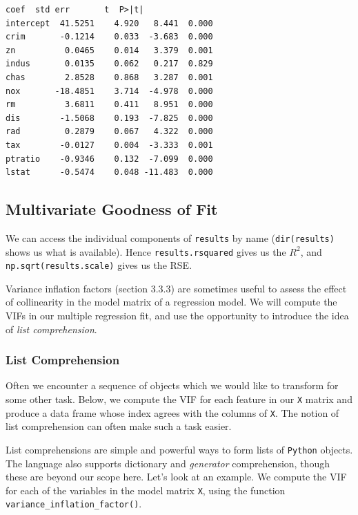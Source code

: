 \documentclass[11pt]{article}
\makeatletter
\newcommand{\boxspacing}{\kern\kvtcb@left@rule\kern\kvtcb@boxsep}
\newcommand{\prompt}[4]{
        {\ttfamily\llap{{\color{#2}[#3]:\hspace{3pt}#4}}\vspace{-\baselineskip}}
    }
\makeatother
\begin{document}
            \begin{tcolorbox}[breakable, size=fbox, boxrule=.5pt, pad at break*=1mm, opacityfill=0]
\prompt{Out}{outcolor}{28}{\boxspacing}
\begin{Verbatim}[commandchars=\\\{\}]
              coef  std err       t  P>|t|
intercept  41.5251    4.920   8.441  0.000
crim       -0.1214    0.033  -3.683  0.000
zn          0.0465    0.014   3.379  0.001
indus       0.0135    0.062   0.217  0.829
chas        2.8528    0.868   3.287  0.001
nox       -18.4851    3.714  -4.978  0.000
rm          3.6811    0.411   8.951  0.000
dis        -1.5068    0.193  -7.825  0.000
rad         0.2879    0.067   4.322  0.000
tax        -0.0127    0.004  -3.333  0.001
ptratio    -0.9346    0.132  -7.099  0.000
lstat      -0.5474    0.048 -11.483  0.000
\end{Verbatim}
\end{tcolorbox}
        
    \hypertarget{multivariate-goodness-of-fit}{%
\subsection{Multivariate Goodness of
Fit}\label{multivariate-goodness-of-fit}}

We can access the individual components of \texttt{results} by name
(\texttt{dir(results)} shows us what is available). Hence
\texttt{results.rsquared} gives us the \(R^2\), and
\texttt{np.sqrt(results.scale)} gives us the RSE.

Variance inflation factors (section 3.3.3) are sometimes useful to
assess the effect of collinearity in the model matrix of a regression
model. We will compute the VIFs in our multiple regression fit, and use
the opportunity to introduce the idea of \emph{list comprehension}.

\hypertarget{list-comprehension}{%
\subsubsection{List Comprehension}\label{list-comprehension}}

Often we encounter a sequence of objects which we would like to
transform for some other task. Below, we compute the VIF for each
feature in our \texttt{X} matrix and produce a data frame whose index
agrees with the columns of \texttt{X}. The notion of list comprehension
can often make such a task easier.

List comprehensions are simple and powerful ways to form lists of
\texttt{Python} objects. The language also supports dictionary and
\emph{generator} comprehension, though these are beyond our scope here.
Let's look at an example. We compute the VIF for each of the variables
in the model matrix \texttt{X}, using the function
\texttt{variance\_inflation\_factor()}.
\end{document}

